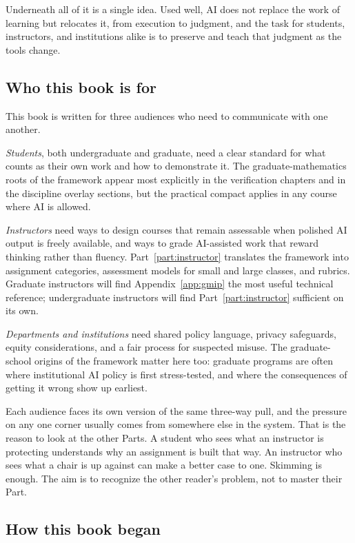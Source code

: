 \documentclass{SIAMbook2023}
\begin{document}
\begin{thepreface}
Underneath all of it is a single idea. Used well, AI does not replace the work of learning but relocates it, from execution to judgment, and the task for students, instructors, and institutions alike is to preserve and teach that judgment as the tools change.

\subsection*{Who this book is for}

This book is written for three audiences who need to communicate with one another.

\textit{Students}, both undergraduate and graduate, need a clear standard for what counts as their own work and how to demonstrate it. The graduate-mathematics roots of the framework appear most explicitly in the verification chapters and in the discipline overlay sections, but the practical compact applies in any course where AI is allowed.

\textit{Instructors} need ways to design courses that remain assessable when polished AI output is freely available, and ways to grade AI-assisted work that reward thinking rather than fluency. Part~\ref{part:instructor} translates the framework into assignment categories, assessment models for small and large classes, and rubrics. Graduate instructors will find Appendix~\ref{app:gmip} the most useful technical reference; undergraduate instructors will find Part~\ref{part:instructor} sufficient on its own.

\textit{Departments and institutions} need shared policy language, privacy safeguards, equity considerations, and a fair process for suspected misuse. The graduate-school origins of the framework matter here too: graduate programs are often where institutional AI policy is first stress-tested, and where the consequences of getting it wrong show up earliest.

Each audience faces its own version of the same three-way pull, and the pressure on any one corner usually comes from somewhere else in the system. That is the reason to look at the other Parts. A student who sees what an instructor is protecting understands why an assignment is built that way. An instructor who sees what a chair is up against can make a better case to one. Skimming is enough. The aim is to recognize the other reader's problem, not to master their Part.

\subsection*{How this book began}


\end{thepreface}
\end{document}
